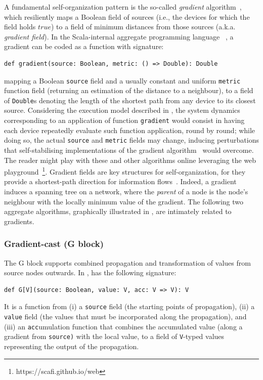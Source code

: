 A fundamental self-organization pattern
 is the so-called \emph{gradient} algorithm~\cite{DBLP:conf/saso/AudritoCDV17},
 which resiliently maps 
 a Boolean field of sources 
 (i.e., the devices for which the field holds $true$) %
 to a field of minimum distances from those sources
 (a.k.a. \emph{gradient field}).
%
In the Scala-internal aggregate programming language \scafi{}~\cite{DBLP:conf/isola/CasadeiVAD20},
 a gradient can be coded as a function 
  with signature:
\begin{lstlisting}
def gradient(source: Boolean, metric: () => Double): Double
\end{lstlisting}
mapping a Boolean \lstinline|source| field
 and a usually constant and uniform \lstinline|metric| function field (returning an estimation of the distance to a neighbour),
 to a field of \lstinline|Double|s 
 denoting the length of the shortest path from any device to its closest source.
%
Considering the execution model described in ,
 the system dynamics corresponding to an application of function \lstinline|gradient|  would consist in having each device
 repeatedly evaluate such function application,
 round by round;
 while doing so, 
 the actual \lstinline|source| and \lstinline|metric| fields may change, inducing perturbations
 that self-stabilising implementations of the gradient algorithm~\cite{DBLP:journals/tomacs/ViroliABDP18} would overcome.
%
The reader might play with these and other algorithms online leveraging the \scafi{} web playground~\cite{DBLP:conf/coordination/AguzziCMPV21}\footnote{https://scafi.github.io/web}.
%
Gradient fields are key structures for self-organization,
 for they provide a shortest-path direction for information flows~\cite{DBLP:conf/saso/WolfH07}.
%
Indeed, a gradient induces a spanning tree on a network,
 where the \emph{parent} of a node 
 is the node's neighbour with the locally minimum value of the gradient.
%
The following two aggregate algorithms, graphically illustrated in , are intimately related to gradients.
 
\subsubsection{Gradient-cast (G block)}
%
The G block supports combined propagation and transformation of values from source nodes outwards.
%
In \scafi{},
  has the following signature:
\begin{lstlisting}[language=scafi]
def G[V](source: Boolean, value: V, acc: V => V): V
\end{lstlisting}
It is a function
 from 
 (i) a \lstinline|source| field (the starting points of propagation),
 (ii) a \lstinline|value| field (the values that must be incorporated along the propagation),
 and 
 (iii) %
 an \lstinline|acc|umulation function
 that combines
  the accumulated value (along a gradient from \lstinline|source)| with the local value,
  to a field of \lstinline|V|-typed values
  representing the output of the propagation.
%

